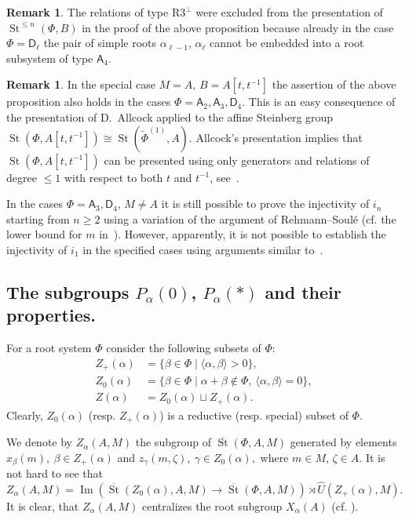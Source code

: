 \documentclass[oneside, 8pt]{amsart}
\theoremstyle{remark}
\theoremstyle{definition}
\numberwithin{lemma}{section}
\numberwithin{prop}{section}
\numberwithin{corollary}{section}
\numberwithin{externaltheorem}{section}
\newtheorem{rem}[lemma]{Remark}
\DeclareMathOperator{\Img}{Im}
\DeclareMathOperator{\St}{St}
\newcommand{\inv}{^{-1}}
\newcommand{\rA}{\mathsf{A}}
\newcommand{\rD}{\mathsf{D}}
\numberwithin{equation}{section}
\begin{document}
\begin{rem}
 The relations of type $\text{R3}^\bot$ were excluded from the presentation of $\St^{\leq n}(\Phi, B)$ in the proof of the above proposition because already in the case $\Phi=\rD_\ell$ the pair of simple roots $\alpha_{\ell-1}$, $\alpha_{\ell}$ cannot be embedded into a root subsystem of type $\rA_4$.
\end{rem}
\begin{rem}
 In the special case $M=A$, $B = A[t, t\inv]$ the assertion of the above proposition also holds in the cases $\Phi=\rA_2, \rA_3, \rD_4$. This is an easy consequence of the presentation of D.~Allcock applied to the affine Steinberg group $\St(\Phi, A[t, t\inv]) \cong \St(\widetilde{\Phi}^{(1)}, A)$. Allcock's presentation implies that $\St(\Phi, A[t, t\inv])$ can be presented using only generators and relations of degree $\leq 1$ with respect to both $t$ and $t^{-1}$, see~\cite[Corollary~1.3]{A13}.
 
 In the cases $\Phi = \rA_3, \rD_4$, $M \neq A$ it is still possible to prove the injectivity of $i_n$ starting from $n\geq 2$ using a variation of the argument of Rehmann--Soul{\'e} (cf. the lower bound for $m$ in~\cite[3.2.1]{RS76}). However, apparently, it is not possible to establish the injectivity of $i_1$ in the specified cases using arguments similar to~\cite{RS76}.
\end{rem}


\subsection{The subgroups \texorpdfstring{$P_\alpha(0)$}{Pa(0)}, \texorpdfstring{$P_\alpha(*)$}{Pa(*)} and their properties.} \label{sec:Pa0-basic}
For a root system $\Phi$ consider the following subsets of $\Phi$:
\begin{align} Z_+(\alpha) & = \{ \beta \in \Phi \mid \langle \alpha, \beta \rangle > 0 \}, \\
   Z_0(\alpha) & = \{ \beta \in \Phi \mid \alpha + \beta \not\in \Phi,\ \langle \alpha, \beta \rangle = 0 \}, \\
   Z(\alpha)   & = Z_0(\alpha) \sqcup Z_+(\alpha). \end{align} 
Clearly, $Z_0(\alpha)$ (resp. $Z_+(\alpha)$) is a reductive (resp. special) subset of $\Phi$.
   
We denote by $Z_\alpha(A, M)$ the subgroup of $\overline{\St}(\Phi, A, M)$ generated by elements
 $x_{\beta}(m),\ \beta \in Z_+(\alpha)$ and $z_{\gamma}(m, \zeta),\ \gamma \in Z_0(\alpha),$ where $m \in M$, $\zeta \in A$.
It is not hard to see that \[Z_\alpha(A, M) = \Img\left(\overline{\St}(Z_0(\alpha), A, M) \to \overline{\St}(\Phi, A, M)\right) \rtimes \hat{U}(Z_+(\alpha), M). \]
It is clear, that $Z_\alpha(A, M)$ centralizes the root subgroup $X_\alpha(A)$ (cf. \cite[984]{St71}).
\end{document}
